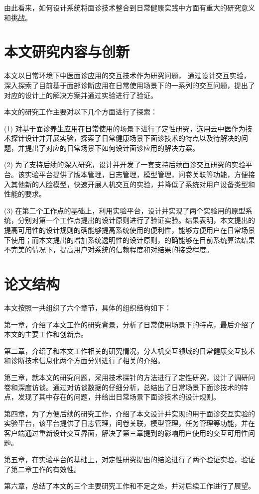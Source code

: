 
由此看来，如何设计系统将面诊技术整合到日常健康实践中方面有重大的研究意义和挑战。



\section{本文研究内容与创新}

本文以日常环境下中医面诊应用的交互技术作为研究问题，
通过设计交互实验，深入探索了目前基于面部诊断应用在日常使用场景下的一系列的交互问题，提出了对应的设计上的解决方案并通过实验进行了验证。

本文的研究工作主要对以下几个方面进行了探索：

(1) 对基于面诊养生应用在日常使用的场景下进行了定性研究，选用云中医作为技术探针设计并开展实验，探索了日常健康场景下面诊技术的特点以及待解决的问题，并提出了对应的日常场景下如何设计面诊应用的解决方案。

(2) 为了支持后续的深入研究，设计并开发了一套支持后续面诊交互研究的实验平台。该实验平台提供了版本管理，日志管理，模型管理，问卷关联等功能，方便接入其他新的人脸模型，快速开展人机交互的实验，并降低了系统对用户设备类型和性能的要求。

(3) 在第二个工作点的基础上，利用实验平台，设计并实现了两个实验用的原型系统，分别对第一个工作点提出的设计原则进行了验证实验。结果表明，本文提出的提高可用性的设计规则的确能够提高系统使用的便利性，能够方便用户在日常场景下使用；而本文提出的增加系统透明性的设计原则，的确能够在目前系统算法结果不完美的情况下，提高用户对系统的信赖程度和对结果的接受程度。


\section{论文结构}
本文按照一共组织了六个章节，具体的组织结构如下：

第一章，介绍了本文工作的研究背景，分析了日常使用场景下的特点，最后介绍了本文的主要工作和创新点。

第二章，介绍了和本文工作相关的研究情况，分人机交互领域的日常健康交互技术和诊断技术信息化两个方面分别进行了相关的介绍。

第三章，就本文的研究问题，采用技术探针的方法进行了定性研究，设计了调研问卷和深度访谈。通过对访谈数据的仔细分析，总结出了日常场景下面诊技术的特点，发现了其中存在的问题，并给出日常场景下面诊技术的设计规则。

第四章，为了方便后续的研究工作，介绍了本文设计并实现的用于面诊交互实验的实验平台，该平台提供了日志管理，问卷关联，模型管理，任务管理等功能，并在客户端通过重新设计交互界面，解决了第三章提到的影响用户使用的交互可用性问题。

第五章，在实验平台的基础上，对定性研究提出的结论进行了两个验证实验，验证了第二章工作的有效性。

第六章，总结了本文的三个主要研究工作和不足之处，并对后续工作进行了展望。